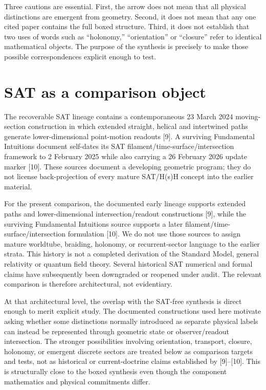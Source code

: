 \documentclass[11pt]{article}
\begin{document}
Three cautions are essential. First, the arrow does not mean that all physical distinctions are emergent from geometry. Second, it does not mean that any one cited paper contains the full boxed structure. Third, it does not establish that two uses of words such as ``holonomy,'' ``orientation'' or ``closure'' refer to identical mathematical objects. The purpose of the synthesis is precisely to make those possible correspondences explicit enough to test.

\section{SAT as a comparison object}
The recoverable SAT lineage contains a contemporaneous 23 March 2024 moving-section construction in which extended straight, helical and intertwined paths generate lower-dimensional point-motion readouts [9]. A surviving Fundamental Intuitions document self-dates its SAT filament/time-surface/intersection framework to 2 February 2025 while also carrying a 26 February 2026 update marker [10]. These sources document a developing geometric program; they do not license back-projection of every mature SAT/H(s)H concept into the earlier material.

For the present comparison, the documented early lineage supports extended paths and lower-dimensional intersection/readout constructions [9], while the surviving Fundamental Intuitions source supports a later filament/time-surface/intersection formulation [10]. We do not use those sources to assign mature worldtube, braiding, holonomy, or recurrent-sector language to the earlier strata. This history is not a completed derivation of the Standard Model, general relativity or quantum field theory. Several historical SAT numerical and formal claims have subsequently been downgraded or reopened under audit. The relevant comparison is therefore architectural, not evidentiary.

At that architectural level, the overlap with the SAT-free synthesis is direct enough to merit explicit study. The documented constructions used here motivate asking whether some distinctions normally introduced as separate physical labels can instead be represented through geometric state or observer/readout intersection. The stronger possibilities involving orientation, transport, closure, holonomy, or emergent discrete sectors are treated below as comparison targets and tests, not as historical or current-doctrine claims established by [9]--[10]. This is structurally close to the boxed synthesis even though the component mathematics and physical commitments differ.
\end{document}
